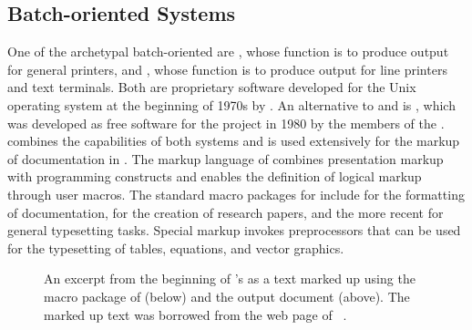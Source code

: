 \subsection{Batch-oriented Systems}
One of the archetypal batch-oriented  are %
, whose function is to produce output for general
printers, and %
, whose function is to
produce output for line printers and text terminals. Both are proprietary
software developed for the Unix operating system at the beginning of 1970s by
. An alternative to  and  is
, which was
developed as free software for the  project in 1980 by the members
of the .  combines the capabilities of both systems
and is used extensively for the markup of documentation in \Unices. The
markup language of  combines presentation
markup with programming constructs and enables the
definition of logical markup through user macros. The
standard macro packages for  include  for the
 formatting of documentation,
  for the creation
of research papers, and the more recent 
 for general typesetting tasks.
Special markup invokes preprocessors that can be used for the typesetting of
tables, equations, and vector graphics.

\begin{figure}
  \vspace{.45em}%
  \vspace{.45em}%
  \caption{An excerpt from the beginning of 's
     as a
    text marked up using the  macro package of 
    (below) and the output document (above). The marked up text was borrowed
    from the web page of ~\cite{schaffter15}.}
  \label{fig:poe}
\end{figure}


